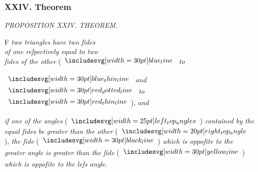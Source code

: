 \documentclass[11pt,preview]{standalone}
\begin{document}
\subsubsection{XXIV. Theorem}

\begin{minipage}[t]{0.43\textwidth}
    \vspace{20pt}
    
\end{minipage}%
\hfill
\begin{minipage}[t]{0.54\textwidth}
    \begin{center}
        \textit{PROPOSITION XXIV. THEOREM.}\label{book1pr24} \\
    \end{center}

    \hfill

    \begin{center}
        \raggedright \lettrine[lines=3, loversize=1, nindent=0pt]{}{}F \textit{two triangles have two ſides\\ of one reſpectively equal to two\\ ſides of the other} (\hspace{-1ex}$\blueline$ \textit{to}
    \end{center}
    $\bluethinline$ \textit{and} $\dottedredline$ \textit{to} $\redthinline$\hspace{-1ex}), \textit{and}
\end{minipage}
\textit{if one of the angles} (\hspace{-1ex}$\img{left_top_angles}$\hspace{-1ex}) \textit{contained by the equal ſides be greater than the other } (\hspace{-1ex}$\img[0][0][20]{right_top_angle}$\hspace{-1ex}), \textit{the ſide} (\hspace{-1ex}$\blackline$\hspace{-1ex}) \textit{which is oppoſite to the greater angle is greater than the ſide} (\hspace{-1ex}$\yellowline$\hspace{-1ex}) \textit{which is oppoſite to the leſs angle}.

\vspace{1ex}
\end{document}
